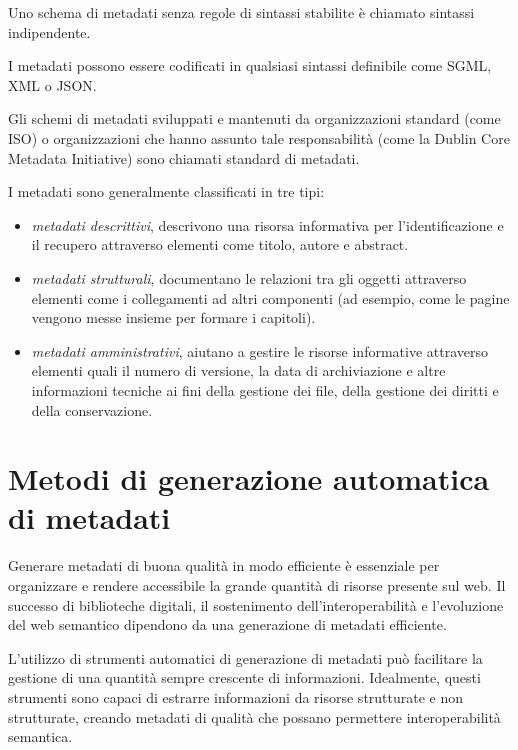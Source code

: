 Uno schema di metadati senza regole di sintassi stabilite è chiamato sintassi indipendente.

I metadati possono essere codificati in qualsiasi sintassi definibile come SGML, XML o JSON.

Gli schemi di metadati sviluppati e mantenuti da organizzazioni standard (come ISO) o organizzazioni che hanno assunto tale responsabilità (come la Dublin Core Metadata Initiative) sono chiamati standard di metadati.

I metadati sono generalmente classificati in tre tipi:
\begin{itemize}
\item \textit{metadati descrittivi}, descrivono una risorsa informativa per l'identificazione e il recupero attraverso elementi come titolo, autore e abstract.
\item \textit{metadati strutturali}, documentano le relazioni tra gli oggetti attraverso elementi come i collegamenti ad altri componenti (ad esempio, come le pagine vengono messe insieme per formare i capitoli).
\item \textit{metadati amministrativi}, aiutano a gestire le risorse informative attraverso elementi quali il numero di versione, la data di archiviazione e altre informazioni tecniche ai fini della gestione dei file, della gestione dei diritti e della conservazione.
\end{itemize}

\section{Metodi di generazione automatica di metadati}
Generare metadati di buona qualità in modo efficiente è essenziale per organizzare e rendere accessibile la grande quantità di risorse presente sul web. Il successo di biblioteche digitali, il sostenimento dell'interoperabilità e l'evoluzione del web semantico dipendono da una generazione di metadati efficiente\cite{metadata}.

\vspace{5mm}

L'utilizzo di strumenti automatici di generazione di metadati può facilitare la gestione di una quantità sempre crescente di informazioni.
Idealmente, questi strumenti sono capaci di estrarre informazioni da risorse strutturate e non strutturate, creando metadati di qualità che possano permettere interoperabilità semantica.

\vspace{5mm}

